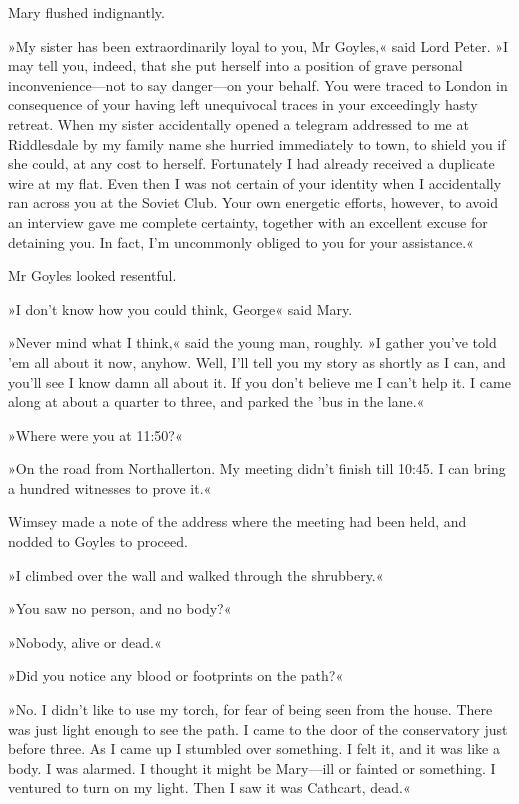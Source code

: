 Mary flushed indignantly.

»My sister has been extraordinarily loyal to you, Mr Goyles,« said Lord Peter. »I may tell you, indeed, that she put herself into a position of grave personal inconvenience\allowbreak---\allowbreak not to say danger\allowbreak---\allowbreak on your behalf. You were traced to London in consequence of your having left unequivocal traces in your exceedingly hasty retreat. When my sister accidentally opened a telegram addressed to me at Riddlesdale by my family name she hurried immediately to town, to shield you if she could, at any cost to herself. Fortunately I had already received a duplicate wire at my flat. Even then I was not certain of your identity when I accidentally ran across you at the Soviet Club. Your own energetic efforts, however, to avoid an interview gave me complete certainty, together with an excellent excuse for detaining you. In fact, I'm uncommonly obliged to you for your assistance.«

Mr Goyles looked resentful.

»I don't know how you could think, George\longdash« said Mary.

»Never mind what I think,« said the young man, roughly. »I gather you've told 'em all about it now, anyhow. Well, I'll tell you my story as shortly as I can, and you'll see I know damn all about it. If you don't believe me I can't help it. I came along at about a quarter to three, and parked the 'bus in the lane.«

»Where were you at 11:50?«

»On the road from Northallerton. My meeting didn't finish till 10:45. I can bring a hundred witnesses to prove it.«

Wimsey made a note of the address where the meeting had been held, and nodded to Goyles to proceed.

»I climbed over the wall and walked through the shrubbery.«

»You saw no person, and no body?«

»Nobody, alive or dead.«

»Did you notice any blood or footprints on the path?«

»No. I didn't like to use my torch, for fear of being seen from the house. There was just light enough to see the path. I came to the door of the conservatory just before three. As I came up I stumbled over something. I felt it, and it was like a body. I was alarmed. I thought it might be Mary\allowbreak---\allowbreak ill or fainted or something. I ventured to turn on my light. Then I saw it was Cathcart, dead.«

